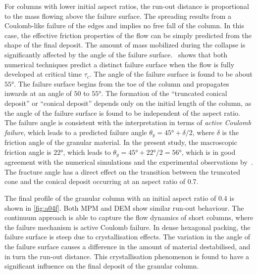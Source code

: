 For columns with lower initial aspect ratios, the run-out distance is 
proportional to the mass flowing above the failure surface. The spreading 
results from a Coulomb-like failure of the edges and implies no free fall of 
the column. In this case, the effective friction 
properties of the flow can be simply predicted from the shape of the final 
deposit. The amount of mass mobilized during the collapse is significantly 
affected by the angle of the failure surface.~ shows that both 
numerical techniques predict a distinct failure surface when the flow is fully 
developed at critical time $\tau_{\textit{c}}$. The angle of the failure 
surface is found to be about $55\si{\degree}$. The failure surface begins from 
the toe of the column and propagates inwards at an angle of $50$ to 
$55\si{\degree}$. The formation of the ``truncated conical deposit'' or 
``conical deposit'' depends only on the initial length of the column, as the 
angle of the failure surface is found to be independent of the aspect ratio. 
The failure angle is consistent with the interpretation in terms of 
\textit{active Coulomb failure}, which leads to a 
predicted failure angle $\theta_{\textit{y}}=45\si{\degree}+\delta / 2$, where 
$\delta$ is the friction angle of the granular material. In the 
present study, the macroscopic friction angle is $22\si{\degree}$, which 
leads to $\theta_{\textit{y}}=45\si{\degree}+22\si{\degree}/ 2=56\si{\degree}$, 
which is in good agreement with the numerical simulations and the experimental 
observations by~\citet{Lajeunesse2004}. The fracture angle has a 
direct effect on the transition between the truncated cone and the conical 
deposit occurring at an aspect ratio of 0.7.

The final profile of the granular column with an initial aspect ratio 
of 0.4 is shown in \cref{fig:a04f}. Both MPM and DEM show similar run-out 
behaviour. The continuum approach is able to capture the flow dynamics of short 
columns, where the failure mechanism is active Coulomb failure. In dense 
hexagonal packing, the failure surface is steep due to crystallisation effects. 
The variation in the angle of the failure surface causes a difference in the 
amount of material destabilised, and in turn the run-out distance. 
This crystallisation phenomenon is found to have a significant influence on the 
final deposit of the granular column.

